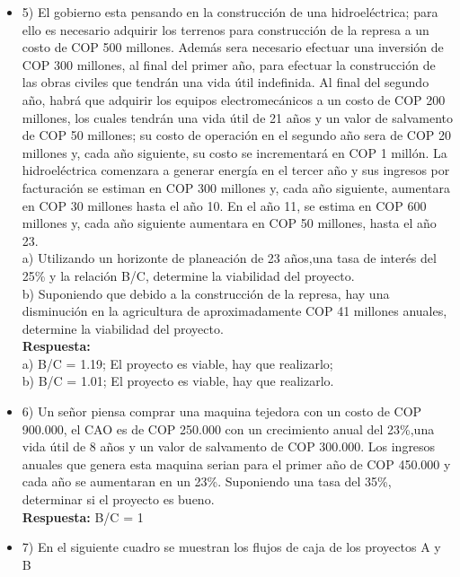 \begin{itemize}
 \item 5)	El gobierno esta pensando en la construcción de una hidroeléctrica; para ello es necesario adquirir los terrenos para construcción de la represa a un costo de COP 500 millones. Además sera necesario efectuar una inversión de COP 300 millones, al final del primer año, para efectuar la construcción de las obras civiles que tendrán una vida útil indefinida. Al final del segundo año, habrá que adquirir los equipos electromecánicos a un costo de COP 200 millones, los cuales  tendrán una vida útil de 21 años y un valor de salvamento de COP 50 millones; su costo de operación en el segundo año sera de COP 20 millones y, cada año siguiente, su costo se incrementará en COP 1 millón. La hidroeléctrica comenzara a generar energía en el tercer año y sus ingresos por facturación se estiman en COP 300 millones y, cada año siguiente, aumentara en COP 30 millones hasta el año 10. En el año 11, se estima en COP 600 millones y, cada año siguiente aumentara en COP 50 millones, hasta el año 23.\\

       a) Utilizando un horizonte de planeación de 23 años,una tasa de interés del 25\% y la relación B/C, determine la viabilidad del proyecto.\\

       b) Suponiendo que debido a la construcción de la represa, hay una disminución en la agricultura de aproximadamente COP 41 millones anuales, determine la viabilidad del proyecto.\\

       \textbf{Respuesta:} \\a) B/C = 1.19; El proyecto es viable, hay que realizarlo;\\ b) B/C = 1.01; El proyecto es viable, hay que realizarlo.
       \medskip

 \item 6)	Un señor piensa comprar una maquina tejedora con un costo de COP 900.000, el CAO es de COP 250.000 con un crecimiento anual del 23\%,una vida útil de 8 años y un valor de salvamento de COP 300.000. Los ingresos anuales que genera esta maquina serian para el primer año de COP 450.000 y cada año se aumentaran en un 23\%. Suponiendo una tasa del 35\%, determinar si el proyecto es bueno.\\

       \textbf{Respuesta:} B/C = 1
       \medskip

 \item 7)	En el siguiente cuadro se muestran los flujos de caja de los proyectos A y B\\


\end{itemize}
